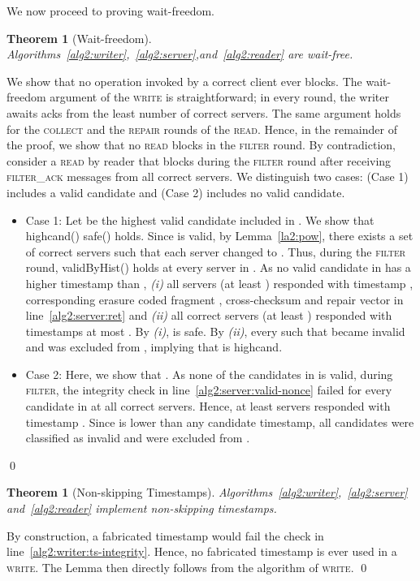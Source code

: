 \documentclass[10pt,conference,compsocconf]{IEEEtran}
\newtheorem{theo}[defn]{Theorem}
\newenvironment{prooff}{\vspace{1ex}\noindent{\bf Proof:}\hspace{0.5em}}
	{\hfill\qed\vspace{1em}}
\begin{document}
We now proceed to proving wait-freedom.
\begin{theo}[Wait-freedom] Algorithms~\ref{alg2:writer},~\ref{alg2:server},and~\ref{alg2:reader} are wait-free.
\end{theo}
\begin{prooff} We show that no operation invoked by a correct client ever blocks. The wait-freedom argument of the \textsc{write} is straightforward; in every round, the writer awaits acks from the least number  of correct servers. The same argument holds for the \textsc{collect} and the \textsc{repair} rounds of the \textsc{read}. Hence, in the remainder of the proof, we show that no \textsc{read} blocks in the \textsc{filter} round. By contradiction, consider a \textsc{read}  by reader  that blocks during the \textsc{filter} round after receiving \textsc{filter\_ack} messages from all correct servers. We distinguish two cases: (Case 1)  includes a valid candidate and (Case 2)  includes no valid candidate.

\begin{itemize}
\item Case 1: Let  be the highest valid candidate included in . We show that \textsf{highcand}()  \textsf{safe}() holds. Since  is valid, by Lemma~\ref{la2:pow}, there exists a set  of  correct servers such that each server  changed  to . Thus, during the \textsc{filter} round, \textsf{validByHist}() holds at every server in . As no valid candidate in  has a higher timestamp than , \textit{(i)} all servers  (at least ) responded with timestamp , corresponding erasure coded fragment , cross-checksum  and repair vector  in line~\ref{alg2:server:ret} and \textit{(ii)} all correct servers (at least ) responded with timestamps at most . By \emph{(i)},  is \textsf{safe}. By \emph{(ii)}, every  such that  became \textsf{invalid} and was excluded from , implying that  is \textsf{highcand}.

\item Case 2: Here, we show that . As none of the candidates in  is valid, during \textsc{filter}, the integrity check in line~\ref{alg2:server:valid-nonce} failed for every candidate in  at all correct servers. Hence, at least  servers responded with timestamp . Since  is lower than any candidate timestamp, all candidates were classified as \textsf{invalid} and were excluded from .
\end{itemize}
\end{prooff}


\begin{theo}[Non-skipping Timestamps]
Algorithms~\ref{alg2:writer},~\ref{alg2:server} and~\ref{alg2:reader} implement non-skipping timestamps.
\end{theo}
\begin{prooff} By construction, a fabricated timestamp would fail the check in line~\ref{alg2:writer:ts-integrity}. Hence, no fabricated timestamp is ever used in a \textsc{write}. The Lemma then directly follows from the algorithm of \textsc{write}.
\end{prooff}
\end{document}

